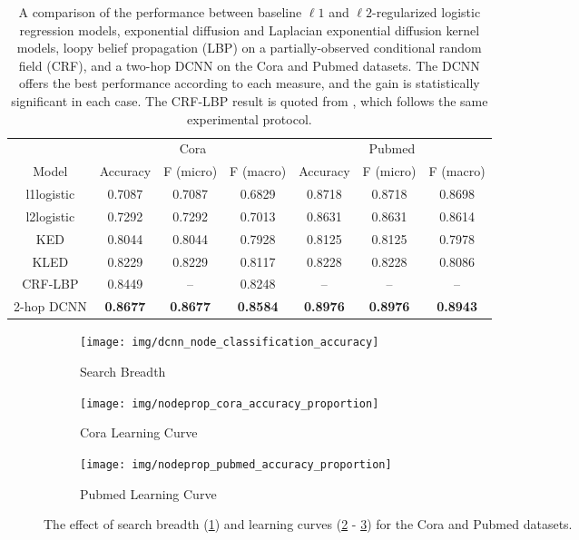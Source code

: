 \documentclass{article}
\newcommand{\subfigwidth}{0.3\textwidth}
\begin{document}
\begin{table}[b]
    \centering
    \begin{tabular}{c|c|c|c||c|c|c|}
         \cline{2-7}
         & \multicolumn{3}{c||}{Cora} & \multicolumn{3}{c|}{Pubmed} \\
         \cline{2-7}
         Model & Accuracy & F (micro) & F (macro) & Accuracy & F (micro) & F (macro) \\
         \hline
         l1logistic & 0.7087 & 0.7087 & 0.6829 & 0.8718 & 0.8718 & 0.8698 \\
         l2logistic & 0.7292 & 0.7292 & 0.7013 & 0.8631 & 0.8631 & 0.8614 \\
         KED & 0.8044 & 0.8044 & 0.7928 & 0.8125 & 0.8125 & 0.7978 \\
         KLED & 0.8229 & 0.8229 & 0.8117 & 0.8228 & 0.8228 & 0.8086 \\
         CRF-LBP & 0.8449 & -- & 0.8248 & -- & -- & -- \\
         2-hop DCNN & \textbf{0.8677} & \textbf{0.8677} & \textbf{0.8584} &  \textbf{0.8976} & \textbf{0.8976} & \textbf{0.8943} \\
         \hline 
    \end{tabular}
    
    \vspace{10pt}
    
    \caption{A comparison of the performance between baseline $\ell 1$ and $\ell 2$-regularized logistic regression models, exponential diffusion and Laplacian exponential diffusion kernel models, loopy belief propagation (LBP) on a partially-observed conditional random field (CRF), and a two-hop DCNN on the Cora and Pubmed datasets.  The DCNN offers the best performance according to each measure, and the gain is statistically significant in each case.  The CRF-LBP result is quoted from \cite{Sen:2007wh}, which follows the same experimental protocol.}
    \label{tab:cora}
\end{table}

\begin{figure}[t]
    \centering
    \begin{subfigure}[t]{\subfigwidth}
        \centering
        \texttt{[image: img/dcnn\_node\_classification\_accuracy]}
        \caption{Search Breadth}
        \label{fig:nodesearchbreadth}
    \end{subfigure}
    \begin{subfigure}[t]{\subfigwidth}
        \centering
        \texttt{[image: img/nodeprop\_cora\_accuracy\_proportion]}
        \caption{Cora Learning Curve}
        \label{fig:nodeclasscoraprop}
    \end{subfigure}
    \begin{subfigure}[t]{\subfigwidth}
        \centering
        \texttt{[image: img/nodeprop\_pubmed\_accuracy\_proportion]}
        \caption{Pubmed Learning Curve}
        \label{fig:nodeclasspubmedprop}
    \end{subfigure}
    \caption{The effect of search breadth (\ref{fig:nodesearchbreadth}) and learning curves (\ref{fig:nodeclasscoraprop} - \ref{fig:nodeclasspubmedprop})  for the Cora and Pubmed datasets.}
    \label{fig:nodeclass}
\end{figure}
\end{document}
